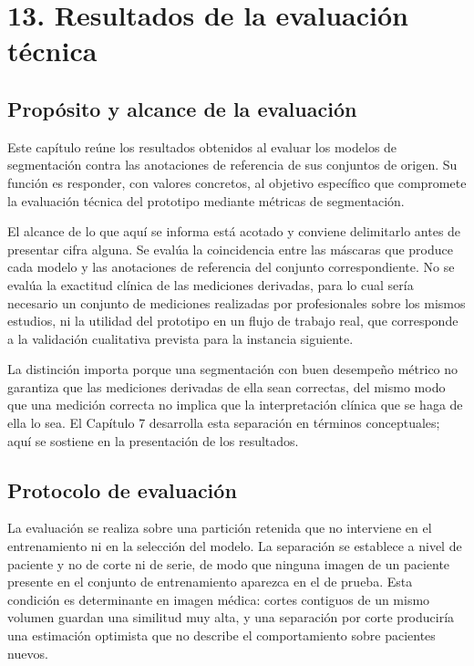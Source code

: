 \chapter{13. Resultados de la evaluación técnica}
\label{chap:resultados-evaluacion}

\section{Propósito y alcance de la evaluación}

Este capítulo reúne los resultados obtenidos al evaluar los modelos de segmentación contra las anotaciones de referencia de sus conjuntos de origen. Su función es responder, con valores concretos, al objetivo específico que compromete la evaluación técnica del prototipo mediante métricas de segmentación.

El alcance de lo que aquí se informa está acotado y conviene delimitarlo antes de presentar cifra alguna. Se evalúa la coincidencia entre las máscaras que produce cada modelo y las anotaciones de referencia del conjunto correspondiente. No se evalúa la exactitud clínica de las mediciones derivadas, para lo cual sería necesario un conjunto de mediciones realizadas por profesionales sobre los mismos estudios, ni la utilidad del prototipo en un flujo de trabajo real, que corresponde a la validación cualitativa prevista para la instancia siguiente.

La distinción importa porque una segmentación con buen desempeño métrico no garantiza que las mediciones derivadas de ella sean correctas, del mismo modo que una medición correcta no implica que la interpretación clínica que se haga de ella lo sea. El Capítulo 7 desarrolla esta separación en términos conceptuales; aquí se sostiene en la presentación de los resultados.

\section{Protocolo de evaluación}

La evaluación se realiza sobre una partición retenida que no interviene en el entrenamiento ni en la selección del modelo. La separación se establece a nivel de paciente y no de corte ni de serie, de modo que ninguna imagen de un paciente presente en el conjunto de entrenamiento aparezca en el de prueba. Esta condición es determinante en imagen médica: cortes contiguos de un mismo volumen guardan una similitud muy alta, y una separación por corte produciría una estimación optimista que no describe el comportamiento sobre pacientes nuevos.

